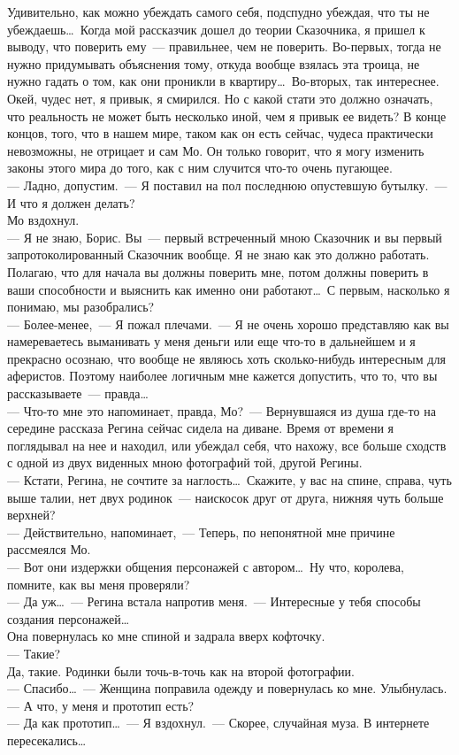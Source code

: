 Удивительно, как можно убеждать самого себя, подспудно убеждая, что ты не 
убеждаешь\ldots\ Когда мой рассказчик дошел до теории Сказочника, я пришел к 
выводу, что поверить ему~--- правильнее, чем не поверить. Во-первых, тогда не нужно 
придумывать объяснения тому, откуда вообще взялась эта троица, не нужно гадать 
о том, как они проникли в квартиру\ldots\ Во-вторых, так интереснее. Окей, чудес 
нет, я привык, я смирился. Но с какой стати это должно означать, что реальность не 
может быть несколько иной, чем я привык ее видеть? В конце концов, того, что в 
нашем мире, таком как он есть сейчас, чудеса практически невозможны, не 
отрицает и сам Мо. Он только говорит, что я могу изменить законы этого мира до того, как 
с ним случится что-то очень пугающее.\\
--- Ладно, допустим.~--- Я поставил на пол последнюю опустевшую бутылку.~--- И 
что я должен делать?\\
Мо вздохнул.\\
--- Я не знаю, Борис. Вы~--- первый встреченный мною Сказочник и вы первый 
запротоколированный Сказочник вообще. Я не знаю как это должно работать. 
Полагаю, что для начала вы должны поверить мне, потом должны поверить в ваши 
способности и выяснить как именно они работают\ldots\ С первым, насколько я 
понимаю, мы разобрались?\\
--- Более-менее,~--- Я пожал плечами.~--- Я не очень хорошо представляю как вы 
намереваетесь выманивать у меня деньги или еще что-то в дальнейшем и я 
прекрасно осознаю, что вообще не являюсь хоть сколько-нибудь интересным для аферистов. 
Поэтому наиболее логичным мне кажется допустить, что то, что вы 
рассказываете~--- правда\ldots\\
--- Что-то мне это напоминает, правда, Мо?~--- Вернувшаяся из душа где-то на 
середине рассказа Регина сейчас сидела на диване. Время от времени я поглядывал 
на нее и находил, или убеждал себя, что нахожу, все больше сходств с одной из 
двух виденных мною фотографий той, другой Регины.\\
--- Кстати, Регина, не сочтите за наглость\ldots\ Скажите, у вас на спине, 
справа, чуть выше талии, нет двух родинок~--- наискосок друг от друга, нижняя чуть 
больше верхней?\\
--- Действительно, напоминает,~--- Теперь, по непонятной мне причине рассмеялся 
Мо.\\ 
--- Вот они издержки общения персонажей с автором\ldots\ Ну что, королева, 
помните, как вы меня проверяли?\\
--- Да уж\ldots~--- Регина встала напротив меня.~--- Интересные у тебя способы 
создания персонажей\ldots\\
Она повернулась ко мне спиной и задрала вверх кофточку.\\
--- Такие?\\
Да, такие. Родинки были точь-в-точь как на второй фотографии.\\
--- Спасибо\ldots~--- Женщина поправила одежду и повернулась ко мне. Улыбнулась.\\
--- А что, у меня и прототип есть?\\
--- Да как прототип\ldots~--- Я вздохнул.~--- Скорее, случайная муза. В 
интернете пересекались\ldots


